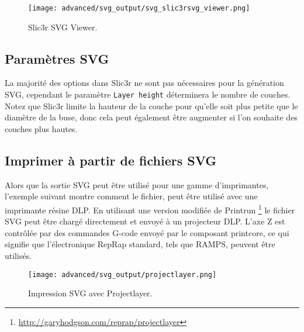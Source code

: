 \begin{figure}[H]
\centering
\texttt{[image: advanced/svg\_output/svg\_slic3rsvg\_viewer.png]}
\caption{Slic3r SVG Viewer.}
\label{fig:svg_slic3rsvg_viewer}
\end{figure}

\subsection{Paramètres SVG} %
\label{sub:svg_settings}

La majorité des options dans Slic3r ne sont pas nécessaires pour la génération SVG, cependant le paramètre \texttt{Layer height} déterminera le nombre de couches. Notez que Slic3r limite la hauteur de la couche pour qu'elle soit plus petite que le diamètre de la buse, donc cela peut également être augmenter si l'on souhaite des couches plus hautes.


\subsection{Imprimer à partir de fichiers SVG} %
\label{sub:printing_with_svg}

Alors que la sortie SVG peut être utilisé pour une gamme d'imprimantes, l'exemple suivant montre comment le fichier, peut être utilisé avec une imprimante résine DLP. En utilisant une version modifiée de Printrun \footnote{\url{http://garyhodgson.com/reprap/projectlayer}} le fichier SVG peut être chargé directement et envoyé à un projecteur DLP. L'axe Z est contrôlée par des commandes G-code envoyé par le composant printcore, ce qui signifie que l'électronique RepRap standard, tels que RAMPS, peuvent être utilisés.


\begin{figure}[H]
\centering
\texttt{[image: advanced/svg\_output/projectlayer.png]}
\caption{Impression SVG avec Projectlayer.}
\label{fig:projectlayer}
\end{figure}



